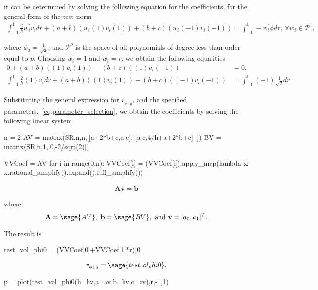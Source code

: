 \documentclass{article}
\numberwithin{equation}{section}
\newcommand{\vect}[1]{\mathbf{{#1}}}
\newcommand{\mat}[1]{\mathbf{{#1}}}
\begin{document}
it can be determined by solving the following equation for the coefficients, for the general form of the test norm
\begin{align}
\int_{-1}^{1} \frac{2}{h} w_i^{'} v_i^{'} dr + (a+b)(w_i(1)v_i(1))+(b+c)(w_i(-1)v_i(-1))
= 
\int_{-1}^{1} -w_i^{'} \phi dr,\ \forall w_i \in \mathcal{P}^1,
\end{align}

where $\phi_0 = \frac{1}{\sqrt{2}}$, and $\mathcal{P}^p$ is the space of all polynomials of degree less than order
equal to $p$. Choosing $w_i = 1$ and $w_i = r$, we obtain the following equalities
\begin{align}
0 + (a+b)((1)v_i(1))+(b+c)((1)v_i(-1)) 
& =
0, \\
\int_{-1}^{1} \frac{2}{h} (1) v_i^{'} dr + (a+b)((1)v_i(1))+(b+c)((-1)v_i(-1))
& = 
\int_{-1}^{1} (-1) \frac{1}{\sqrt{2}} dr.
\end{align}

Substituting the general expression for $v_{{\phi}_{i,0}}$, and the specified
parameters,~\eqref{eq:parameter_selection}, we obtain the coefficients by solving the following linear system
\begin{sagesilent}
n = 2
AV = matrix(SR,n,n,[[a+2*b+c,a-c],
                    [a-c,4/h+a+2*b+c],
                   ])
BV = matrix(SR,n,1,[0,-2/sqrt(2)])

VVCoef = AV\BV
for i in range(0,n):
    VVCoef[i] = (VVCoef[i]).apply_map(lambda x: x.rational_simplify().expand().full_simplify())
\end{sagesilent}

\begin{align}
\mat{A} \hat{\vect{v}} = \vect{b}
\end{align}

where
\begin{align}
\mat{A} = \sage{AV},\ \vect{b} = \sage{BV},\ \text{and}\ \hat{\vect{v}} = [a_0,a_1]^T.
\end{align}

The result is
\begin{sagesilent}
test_vol_phi0 = (VVCoef[0]+VVCoef[1]*r)[0]
\end{sagesilent}

\begin{align} \label{eq:v_opt_vol_p0}
v_{{\phi}_{i,0}} = \sage{test_vol_phi0}.
\end{align}

\begin{sagesilent}
p = plot(test_vol_phi0(h=hv,a=av,b=bv,c=cv),r,-1,1)
\end{sagesilent}
\end{document}
